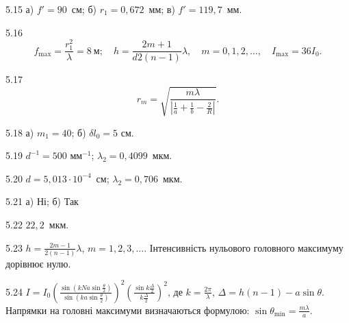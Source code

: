 \begin{Solution}{5.{15}}
        а) $ f' = 90 $~см; б) $ r_1 = 0,672 $~мм; в) $ f' =119,7 $~мм.
    
\end{Solution}
\begin{Solution}{5.{16}}
        \begin{equation*}
            f_{\max} = \frac{r_1^2}{\lambda} = 8\ \text{м}; \quad h = \frac{2m+1}{d2(n - 1)}\lambda, \quad m = 0, 1, 2, \ldots, \quad I_{\max} = 36 I_0.
        \end{equation*}
    
\end{Solution}
\begin{Solution}{5.{17}}
        \begin{equation*}
            r_m = \sqrt{\frac{m\lambda}{\left|\frac1a + \frac1b - \frac2R \right|}}.
        \end{equation*}
    
\end{Solution}
\begin{Solution}{5.{18}}
        а) $ m_1 = 40 $; б) $ \delta l_0 = 5 $ см.
    
\end{Solution}
\begin{Solution}{5.{19}}
        $d^{-1} = 500$ мм$^{-1}$; $ \lambda_2 = 0,4099 $~мкм.
    
\end{Solution}
\begin{Solution}{5.{20}}
         $ d = 5,013\cdot10^{-4} $~см; $ \lambda_2 = 0,706 $~мкм.
    
\end{Solution}
\begin{Solution}{5.{21}}
        а) Ні; б) Так
    
\end{Solution}
\begin{Solution}{5.{22}}
       $ 22,2 $~мкм.
    
\end{Solution}
\begin{Solution}{5.{23}}
        $ h = \frac{2m-1}{2(n-1)}\lambda$, $m = 1, 2, 3, \ldots$. Інтенсивність нульового головного максимуму
        дорівнює нулю.
    
\end{Solution}
\begin{Solution}{5.{24}}
        $I = I_0\left( \frac{\sin \left( kNa\sin\frac\theta2\right) }{\sin \left( ka\sin\frac\theta2\right) } \right)^2
        \left( \frac{\sin k\frac\Delta2}{k\frac\Delta2} \right)^2 $, де $k = \frac{2\pi}{\lambda}$, $\Delta = h (n-1) - a\sin\theta$. Напрямки на головні максимуми визначаються формулою: $\sin\theta_{\min} = \frac{m\lambda}{a}$.
    
\end{Solution}
